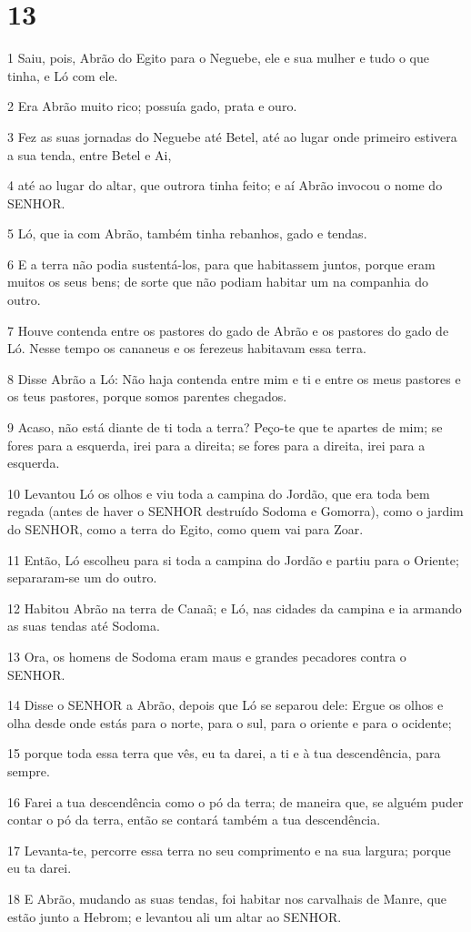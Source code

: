 \chapter{13}

\par 1 Saiu, pois, Abrão do Egito para o Neguebe, ele e sua mulher e tudo o que tinha, e Ló com ele.
\par 2 Era Abrão muito rico; possuía gado, prata e ouro.
\par 3 Fez as suas jornadas do Neguebe até Betel, até ao lugar onde primeiro estivera a sua tenda, entre Betel e Ai,
\par 4 até ao lugar do altar, que outrora tinha feito; e aí Abrão invocou o nome do SENHOR.
\par 5 Ló, que ia com Abrão, também tinha rebanhos, gado e tendas.
\par 6 E a terra não podia sustentá-los, para que habitassem juntos, porque eram muitos os seus bens; de sorte que não podiam habitar um na companhia do outro.
\par 7 Houve contenda entre os pastores do gado de Abrão e os pastores do gado de Ló. Nesse tempo os cananeus e os ferezeus habitavam essa terra.
\par 8 Disse Abrão a Ló: Não haja contenda entre mim e ti e entre os meus pastores e os teus pastores, porque somos parentes chegados.
\par 9 Acaso, não está diante de ti toda a terra? Peço-te que te apartes de mim; se fores para a esquerda, irei para a direita; se fores para a direita, irei para a esquerda.
\par 10 Levantou Ló os olhos e viu toda a campina do Jordão, que era toda bem regada (antes de haver o SENHOR destruído Sodoma e Gomorra), como o jardim do SENHOR, como a terra do Egito, como quem vai para Zoar.
\par 11 Então, Ló escolheu para si toda a campina do Jordão e partiu para o Oriente; separaram-se um do outro.
\par 12 Habitou Abrão na terra de Canaã; e Ló, nas cidades da campina e ia armando as suas tendas até Sodoma.
\par 13 Ora, os homens de Sodoma eram maus e grandes pecadores contra o SENHOR.
\par 14 Disse o SENHOR a Abrão, depois que Ló se separou dele: Ergue os olhos e olha desde onde estás para o norte, para o sul, para o oriente e para o ocidente;
\par 15 porque toda essa terra que vês, eu ta darei, a ti e à tua descendência, para sempre.
\par 16 Farei a tua descendência como o pó da terra; de maneira que, se alguém puder contar o pó da terra, então se contará também a tua descendência.
\par 17 Levanta-te, percorre essa terra no seu comprimento e na sua largura; porque eu ta darei.
\par 18 E Abrão, mudando as suas tendas, foi habitar nos carvalhais de Manre, que estão junto a Hebrom; e levantou ali um altar ao SENHOR.

